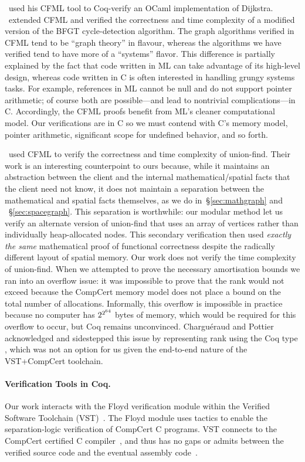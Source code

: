 \citet{char11}~used his CFML tool to Coq-verify an OCaml implementation of 
Dijkstra. 
\citet{gueneauetal19}~extended CFML and verified the correctness 
and time complexity of a modified version of the BFGT cycle-detection algorithm.
The graph algorithms verified in CFML tend to be ``graph theory'' in flavour, 
whereas the algorithms we have verified tend to have more of a
``systems'' flavor. This difference is partially explained by the fact that 
code written in ML can take advantage of its high-level design, whereas
code written in C is often interested in handling grungy systems tasks. For 
example, references in ML cannot be null and do not support pointer arithmetic; 
of course both are possible---and lead to nontrivial complications---in 
C. Accordingly, the CFML proofs benefit from ML’s cleaner computational model. 
Our verifications are in C so we must contend with C’s memory model, pointer 
arithmetic, significant scope for undefined behavior, and so forth.

\citet{charpott19}~used CFML to verify the correctness and 
time complexity of union-find. Their work is an interesting counterpoint to 
ours because, while it maintains an abstraction between the client and the 
internal mathematical/spatial facts that the client need not know, it does 
not maintain a separation between the mathematical and spatial 
facts themselves, as we do in~\S\ref{sec:mathgraph} and ~\S\ref{sec:spacegraph}.
This separation is worthwhile: our modular method let us verify an alternate 
version of union-find that uses an array of vertices rather than individually 
heap-allocated nodes. This 
secondary verification then used \emph{exactly the same} mathematical proof of 
functional correctness despite the radically different layout of spatial 
memory.
Our work does not verify the time complexity of union-find. When 
we attempted to prove the necessary amortisation bounds we ran into an 
overflow issue: it was impossible to prove that the rank would not exceed 
 because the CompCert memory model does not place a bound on the 
total number of allocations. Informally, this overflow is impossible in 
practice because no computer has $2^{2^{\tiny 64}}$ bytes of memory, which would 
be required for this overflow to occur, but Coq remains unconvinced. 
Chargu{\'{e}}raud and Pottier acknowledged and sidestepped this issue by 
representing rank using the Coq type , which was not an option for us 
given the end-to-end nature of the VST+CompCert toolchain.

\paragraph{Verification Tools in Coq.}
Our work interacts with the Floyd verification module within the Verified 
Software Toolchain (VST)~\cite{appel:programlogics}. The Floyd module uses 
tactics to enable the separation-logic verification of CompCert C programs. 
VST connects to the CompCert certified C compiler~\cite{leroy:compcert}, and 
thus has no gaps or admits between the verified source code and the eventual
assembly code~\cite{appelvst}.

